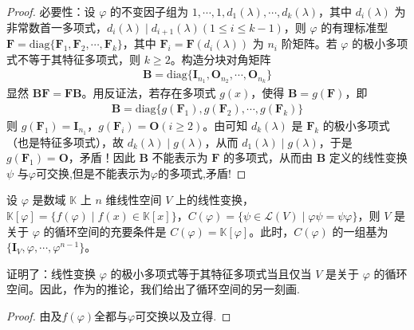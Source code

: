\documentclass[../../main.tex]{subfiles}
\begin{document}
\begin{proof}
{\heiti 必要性：}设 $\varphi$ 的不变因子组为 $1,\cdots,1,d_1(\lambda),\cdots,d_k(\lambda)$，其中 $d_i(\lambda)$ 为非常数首一多项式，$d_i(\lambda)\mid d_{i + 1}(\lambda) (1\leq i\leq k - 1)$，则 $\varphi$ 的有理标准型 $\boldsymbol{F}=\mathrm{diag}\{\boldsymbol{F}_1,\boldsymbol{F}_2,\cdots,\boldsymbol{F}_k\}$，其中 $\boldsymbol{F}_i = \boldsymbol{F}(d_i(\lambda))$ 为 $n_i$ 阶矩阵。若 $\varphi$ 的极小多项式不等于其特征多项式，则 $k\geq 2$。构造分块对角矩阵
\begin{align*}
\boldsymbol{B}=\mathrm{diag}\{\boldsymbol{I}_{n_1},\boldsymbol{O}_{n_2},\cdots,\boldsymbol{O}_{n_k}\}
\end{align*}
显然 $\boldsymbol{BF}=\boldsymbol{FB}$。用反证法，若存在多项式 $g(x)$，使得 $\boldsymbol{B}=g(\boldsymbol{F})$，即
\begin{align*}
\boldsymbol{B}=\mathrm{diag}\{g(\boldsymbol{F}_1),g(\boldsymbol{F}_2),\cdots,g(\boldsymbol{F}_k)\}
\end{align*}
则 $g(\boldsymbol{F}_1)=\boldsymbol{I}_{n_1}$，$g(\boldsymbol{F}_i)=\boldsymbol{O}(i\geq 2)$。由可知 $d_k(\lambda)$ 是 $\boldsymbol{F}_k$ 的极小多项式（也是特征多项式），故 $d_k(\lambda)\mid g(\lambda)$，从而 $d_1(\lambda)\mid g(\lambda)$，于是 $g(\boldsymbol{F}_1)=\boldsymbol{O}$，矛盾！因此 $\boldsymbol{B}$ 不能表示为 $\boldsymbol{F}$ 的多项式，从而由 $\boldsymbol{B}$ 定义的线性变换 $\psi$ 与$\varphi$可交换,但是不能表示为$\varphi$的多项式,矛盾!
\end{proof}

\begin{corollary}\label{corollary:循环子空间的另一种刻画}
设 $\varphi$ 是数域 $\mathbb{K}$ 上 $n$ 维线性空间 $V$ 上的线性变换，$\mathbb{K}[\varphi]=\{f(\varphi)\mid f(x)\in\mathbb{K}[x]\}$，$C(\varphi)=\{\psi\in\mathcal{L}(V)\mid\varphi\psi = \psi\varphi\}$，则 $V$ 是关于 $\varphi$ 的循环空间的充要条件是 $C(\varphi)=\mathbb{K}[\varphi]$。此时，$C(\varphi)$ 的一组基为 $\{\boldsymbol{I}_V,\varphi,\cdots,\varphi^{n - 1}\}$。 
\end{corollary}
\begin{note}
证明了：线性变换 $\varphi$ 的极小多项式等于其特征多项式当且仅当 $V$ 是关于 $\varphi$ 的循环空间。因此，作为的推论，我们给出了循环空间的另一刻画.
\end{note}
\begin{proof}
由及$f(\varphi)$全都与$\varphi$可交换以及立得.
\end{proof}
\end{document}
